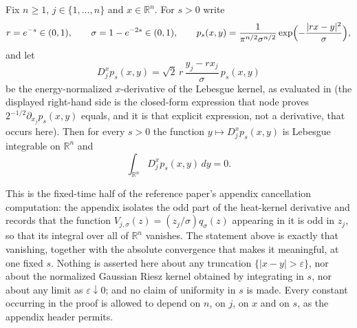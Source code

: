 \begin{lemma}
Fix $n \geq 1$, $j \in \{1,\ldots,n\}$ and $x \in \mathbb{R}^n$.  For $s > 0$
write
\[
  r = e^{-s} \in (0,1), \qquad \sigma = 1 - e^{-2s} \in (0,1),
  \qquad
  p_s(x,y) = \frac{1}{\pi^{n/2}\sigma^{n/2}}
      \exp\Bigl(-\frac{|rx-y|^2}{\sigma}\Bigr) ,
\]
and let
\[
  D_j^x p_s(x,y) = \sqrt2\,r\,\frac{y_j - r x_j}{\sigma}\,p_s(x,y)
\]
be the energy-normalized $x$-derivative of the Lebesgue kernel, as evaluated in
 (the displayed right-hand side is the
closed-form expression that node proves $2^{-1/2}\partial_{x_j}p_s(x,y)$ equals,
and it is that explicit expression, not a derivative, that occurs here).  Then
for every $s > 0$ the function $y \mapsto D_j^xp_s(x,y)$ is Lebesgue integrable
on $\mathbb{R}^n$ and
\[
  \int_{\mathbb{R}^n} D_j^xp_s(x,y)\,dy = 0 .
\]

This is the fixed-time half of the reference paper's appendix cancellation
computation: the appendix isolates the odd part of the heat-kernel derivative
and records that the function $V_{j,\sigma}(z) = (z_j/\sigma)q_\sigma(z)$
appearing in it is odd in $z_j$, so that its integral over all of
$\mathbb{R}^n$ vanishes.  The statement above is exactly that vanishing,
together with the absolute convergence that makes it meaningful, at one fixed
$s$.  Nothing is asserted here about any truncation $\{|x-y|>\varepsilon\}$, nor
about the normalized Gaussian Riesz kernel obtained by integrating in $s$, nor
about any limit as $\varepsilon \downarrow 0$; and no claim of uniformity in
$s$ is made.  Every constant occurring in the proof is allowed to depend on $n$,
on $j$, on $x$ and on $s$, as the appendix header permits.
\end{lemma}
